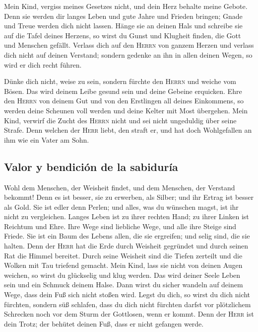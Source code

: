  Mein Kind, vergiss meines Gesetzes nicht, und dein Herz
behalte meine Gebote.  Denn sie werden dir langes Leben
und gute Jahre und Frieden bringen;  Gnade und Treue
werden dich nicht lassen. Hänge sie an deinen Hals und schreibe sie auf
die Tafel deines Herzens,  so wirst du Gunst und Klugheit
finden, die Gott und Menschen gefällt.  Verlass dich auf
den \textsc{Herrn} von ganzem Herzen und verlass dich nicht auf deinen
Verstand;  sondern gedenke an ihn in allen deinen Wegen,
so wird er dich recht führen.

 Dünke dich nicht, weise zu sein, sondern fürchte den
\textsc{Herrn} und weiche vom Bösen.  Das wird deinem
Leibe gesund sein und deine Gebeine erquicken.  Ehre den
\textsc{Herrn} von deinem Gut und von den Erstlingen all deines
Einkommens,  so werden deine Scheunen voll werden und
deine Kelter mit Most übergehen.  Mein Kind, verwirf die
Zucht des \textsc{Herrn} nicht und sei nicht ungeduldig über seine
Strafe.  Denn welchen der \textsc{Herr} liebt, den straft
er, und hat doch Wohlgefallen an ihm wie ein Vater am Sohn.

\hypertarget{valor-y-bendiciuxf3n-de-la-sabiduruxeda}{%
\subsection{Valor y bendición de la
sabiduría}\label{valor-y-bendiciuxf3n-de-la-sabiduruxeda}}

 Wohl dem Menschen, der Weisheit findet, und dem
Menschen, der Verstand bekommt!  Denn es ist besser, sie
zu erwerben, als Silber; und ihr Ertrag ist besser als Gold.
 Sie ist edler denn Perlen; und alles, was du wünschen
magst, ist ihr nicht zu vergleichen.  Langes Leben ist zu
ihrer rechten Hand; zu ihrer Linken ist Reichtum und Ehre.
 Ihre Wege sind liebliche Wege, und alle ihre Steige sind
Friede.  Sie ist ein Baum des Lebens allen, die sie
ergreifen; und selig sind, die sie halten.  Denn der
\textsc{Herr} hat die Erde durch Weisheit gegründet und durch seinen Rat
die Himmel bereitet.  Durch seine Weisheit sind die
Tiefen zerteilt und die Wolken mit Tau triefend gemacht. 
Mein Kind, lass sie nicht von deinen Augen weichen, so wirst du
glückselig und klug werden.  Das wird deiner Seele Leben
sein und ein Schmuck deinem Halse.  Dann wirst du sicher
wandeln auf deinem Wege, dass dein Fuß sich nicht stoßen wird.
 Legst du dich, so wirst du dich nicht fürchten, sondern
süß schlafen,  dass du dich nicht fürchten darfst vor
plötzlichem Schrecken noch vor dem Sturm der Gottlosen, wenn er kommt.
 Denn der \textsc{Herr} ist dein Trotz; der behütet
deinen Fuß, dass er nicht gefangen werde.

